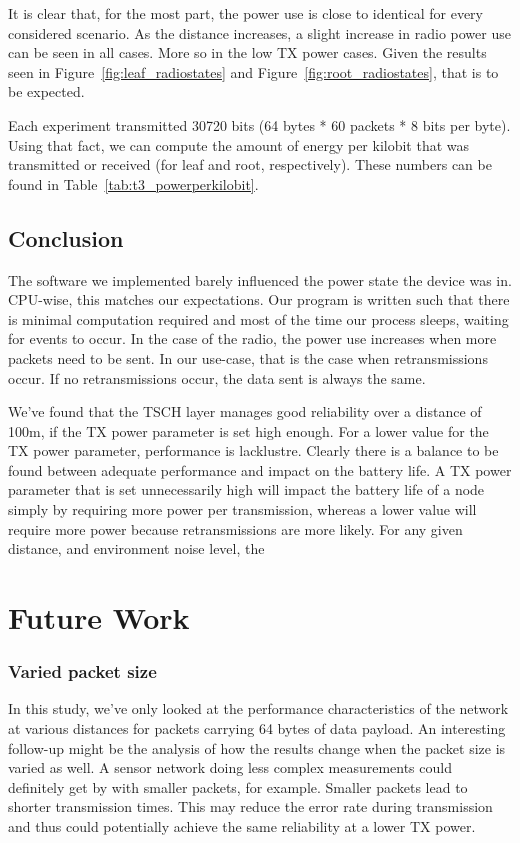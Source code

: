 \documentclass[conference]{IEEEtran}
\newcommand{\figref}[1]{Figure~\ref{#1}}
\newcommand{\tabref}[1]{Table~\ref{#1}}
\renewcommand\_{\textunderscore\allowbreak}
\begin{document}
It is clear that, for the most part, the power use is close to identical for every considered scenario. As the distance increases, a slight increase in radio power use can be seen in all cases. More so in the low TX power cases. Given the results seen in \figref{fig:leaf_radiostates} and \figref{fig:root_radiostates}, that is to be expected. 

Each experiment transmitted 30720 bits (64 bytes * 60 packets * 8 bits per byte). Using that fact, we can compute the amount of energy per kilobit that was transmitted or received (for leaf and root, respectively). These numbers can be found in \tabref{tab:t3_powerperkilobit}. 


\subsection{Conclusion}

The software we implemented barely influenced the power state the device was in. CPU-wise, this matches our expectations. Our program is written such that there is minimal computation required and most of the time our process sleeps, waiting for events to occur. In the case of the radio, the power use increases when more packets need to be sent. In our use-case, that is the case when retransmissions occur. If no retransmissions occur, the data sent is always the same. 

We've found that the TSCH layer manages good reliability over a distance of 100m, if the TX power parameter is set high enough. For a lower value for the TX power parameter, performance is lacklustre. Clearly there is a balance to be found between adequate performance and impact on the battery life. A TX power parameter that is set unnecessarily high will impact the battery life of a node simply by requiring more power per transmission, whereas a lower value will require more power because retransmissions are more likely. For any given distance, and environment noise level, the 

\section{Future Work}
\label{section:futurework}

\subsubsection{Varied packet size}
In this study, we've only looked at the performance characteristics of the network at various distances for packets carrying 64 bytes of data payload. An interesting follow-up might be the analysis of how the results change when the packet size is varied as well. A sensor network doing less complex measurements could definitely get by with smaller packets, for example. Smaller packets lead to shorter transmission times. This may reduce the error rate during transmission and thus could potentially achieve the same reliability at a lower TX power. 
\end{document}
